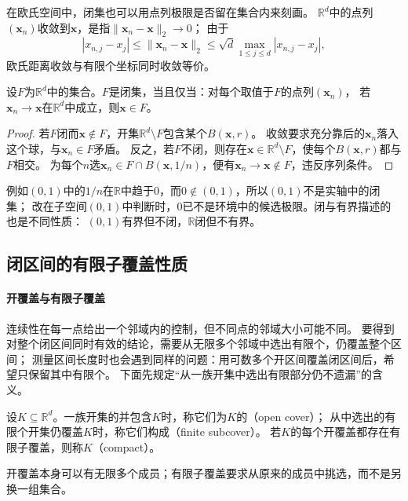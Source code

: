 在欧氏空间中，闭集也可以用点列极限是否留在集合内来刻画。
$\mathbb R^d$中的点列$(\bm{x}_n)$收敛到$\bm{x}$，是指$\lVert\bm{x}_n-\bm{x}\rVert_2\to0$；
由于
\[
  |x_{n,j}-x_j|\leq\lVert\bm{x}_n-\bm{x}\rVert_2
  \leq\sqrt d\max_{1\leq j\leq d}|x_{n,j}-x_j|,
\]
欧氏距离收敛与有限个坐标同时收敛等价。

\begin{lemma}[闭集的序列判据]
\label{lem:analysis-closed-sequence-criterion}
设$F$为$\mathbb R^d$中的集合。$F$是闭集，当且仅当：对每个取值于$F$的点列$(\bm{x}_n)$，
若$\bm{x}_n\to\bm{x}$在$\mathbb R^d$中成立，则$\bm{x}\in F$。
\end{lemma}
\begin{proof}
若$F$闭而$\bm{x}\notin F$，开集$\mathbb R^d\setminus F$包含某个$B(\bm{x},r)$。
收敛要求充分靠后的$\bm{x}_n$落入这个球，与$\bm{x}_n\in F$矛盾。
反之，若$F$不闭，则存在$\bm{x}\in\mathbb R^d\setminus F$，使每个$B(\bm{x},r)$都与$F$相交。
为每个$n$选$\bm{x}_n\in F\cap B(\bm{x},1/n)$，便有$\bm{x}_n\to\bm{x}\notin F$，违反序列条件。
\end{proof}

例如$(0,1)$中的$1/n$在$\mathbb R$中趋于$0$，而$0\notin(0,1)$，所以$(0,1)$不是实轴中的闭集；
改在子空间$(0,1)$中判断时，$0$已不是环境中的候选极限。闭与有界描述的也是不同性质：
$(0,1)$有界但不闭，$\mathbb R$闭但不有界。

\subsection{闭区间的有限子覆盖性质}

\paragraph{开覆盖与有限子覆盖}

连续性在每一点给出一个邻域内的控制，但不同点的邻域大小可能不同。
要得到对整个闭区间同时有效的结论，需要从无限多个邻域中选出有限个，仍覆盖整个区间；
测量区间长度时也会遇到同样的问题：用可数多个开区间覆盖闭区间后，希望只保留其中有限个。
下面先规定“从一族开集中选出有限部分仍不遗漏”的含义。
\begin{definition}[开覆盖与紧致性]
\label{def:analysis-compactness}
设$K\subseteq\mathbb R^d$。一族开集的并包含$K$时，称它们为$K$的（open cover）；
从中选出的有限个开集仍覆盖$K$时，称它们构成（finite subcover）。
若$K$的每个开覆盖都存在有限子覆盖，则称$K$（compact）。
\end{definition}
开覆盖本身可以有无限多个成员；有限子覆盖要求从原来的成员中挑选，而不是另换一组集合。


